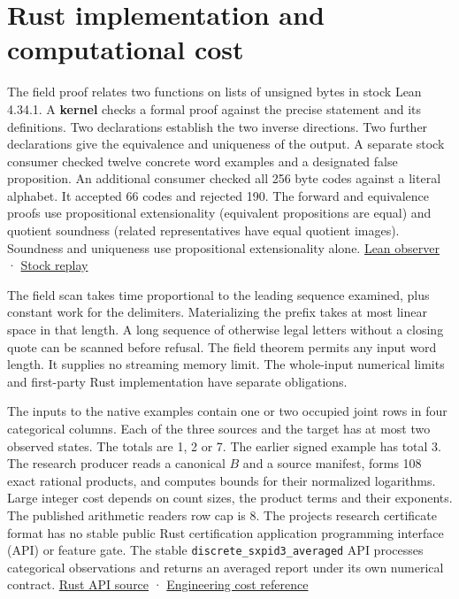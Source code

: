 \clearpage

\section{Rust implementation and computational cost}\label{rust-implementation-and-computational-cost}

The field proof relates two functions on lists of unsigned bytes in stock Lean 4.34.1. A \textbf{kernel} checks a formal proof against the precise statement and its definitions. Two declarations establish the two inverse directions. Two further declarations give the equivalence and uniqueness of the output. A separate stock consumer checked twelve concrete word examples and a designated false proposition. An additional consumer checked all 256 byte codes against a literal alphabet. It accepted 66 codes and rejected 190. The forward and equivalence proofs use propositional extensionality (equivalent propositions are equal) and quotient soundness (related representatives have equal quotient images). Soundness and uniqueness use propositional extensionality alone. \href{https://github.com/sepahead/pid-rs/blob/main/audit/research/categorical-state-token/lean/Observer.lean}{Lean observer} · \href{https://github.com/sepahead/pid-rs/blob/main/audit/research/categorical-state-token/replay.py}{Stock replay}

The field scan takes time proportional to the leading sequence examined, plus constant work for the delimiters. Materializing the prefix takes at most linear space in that length. A long sequence of otherwise legal letters without a closing quote can be scanned before refusal. The field theorem permits any input word length. It supplies no streaming memory limit. The whole-input numerical limits and first-party Rust implementation have separate obligations.

The inputs to the native examples contain one or two occupied joint rows in four categorical columns. Each of the three sources and the target has at most two observed states. The totals are 1, 2 or 7. The earlier signed example has total 3. The research producer reads a canonical \(B\) and a source manifest, forms 108 exact rational products, and computes bounds for their normalized logarithms. Large integer cost depends on count sizes, the product terms and their exponents. The published arithmetic reader\textquotesingle s row cap is 8. The project\textquotesingle s research certificate format has no stable public Rust certification application programming interface (API) or feature gate. The stable \texttt{discrete\_sxpid3\_averaged} API processes categorical observations and returns an averaged report under its own numerical contract. \href{https://github.com/sepahead/pid-rs/blob/main/crates/pid-core/src/sxpid.rs}{Rust API source} · \href{https://github.com/sepahead/pid-rs/blob/main/RUST_IMPLEMENTATION_AND_COST.md}{Engineering cost reference}

